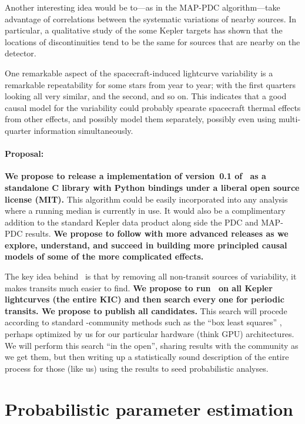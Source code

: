 \documentclass[letterpaper,12pt,preprint]{hack_aastex}
\newcommand{\Untrendy}{\package{Untrendy}}
\begin{document}
Another interesting idea would be to---as in the MAP-PDC algorithm---take
advantage of correlations between the systematic variations of nearby sources.
In particular, a qualitative study of the some Kepler targets has shown that
the locations of discontinuities tend to be the same for sources that are
nearby on the detector.

One remarkable aspect of the spacecraft-induced lightcurve variability is
a remarkable repeatability for some stars from year to year; with the
first quarters looking all very similar, and the second, and so on.
This indicates that a good causal model for the variability could probably
spearate spacecraft thermal effects from other effects, and possibly model
them separately, possibly even using multi-quarter information simultaneously.

\paragraph{Proposal:}
\textbf{We propose to release a implementation of version~0.1 of \Untrendy\ as a standalone C
library with Python bindings under a liberal open source license (MIT).}
This algorithm could be easily incorporated into any analysis where a running
median is currently in use.
It would also be a complimentary addition to the standard Kepler data
product along side the PDC and MAP-PDC results.
\textbf{We propose to follow with more advanced releases as we explore,
understand, and succeed in building more principled causal models of some
of the more complicated effects.}

The key idea behind \Untrendy\ is that by removing all non-transit
sources of variability, it makes transits much easier to find.
\textbf{We propose to run \Untrendy\ on all Kepler lightcurves (the
  entire KIC) and then search every one for periodic transits.  We
  propose to publish all candidates.}
This search will procede
according to standard \Kepler-community methods such as the ``box
least squares'' \citep{box}, perhaps optimized by us for our particular
hardware (think GPU) architectures.
We will perform this search ``in
the open'', sharing results with the community as we get them, but
then writing up a statistically sound description of the entire
process for those (like us) using the results to seed probabilistic
analyses.


\section{Probabilistic parameter estimation}
\end{document}
